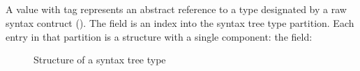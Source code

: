 \subsection{}
\label{sec:ifc:TypeSort:SyntaxTree}

A  value with tag  represents an abstract 
reference to a type designated by a raw syntax contruct ().
The  field is an index into the syntax tree type partition.
Each entry in that partition is a structure with a single component: the  field:
%
\begin{figure}[H]
	\centering
	\caption{Structure of a syntax tree type}
	\label{fig:ifc-syntax-tree-type-structure}
\end{figure}
%



